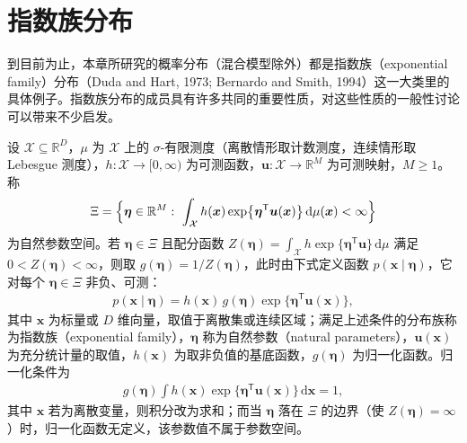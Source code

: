 \documentclass[../../main.tex]{subfiles}
\begin{document}
\section{指数族分布}\label{section:ch03-指数族分布}

到目前为止，本章所研究的概率分布（混合模型除外）都是指数族（exponential family）分布（Duda and Hart, 1973; Bernardo and Smith, 1994）这一大类里的具体例子。指数族分布的成员具有许多共同的重要性质，对这些性质的一般性讨论可以带来不少启发。

\begin{definition}[指数族分布]\label{definition:ch03-指数族分布}
设 $\mathcal{X}\subseteq\mathbb{R}^{D}$，$\mu$ 为 $\mathcal{X}$ 上的 $\sigma$-有限测度（离散情形取计数测度，连续情形取 Lebesgue 测度），$h:\mathcal{X}\to[0,\infty)$ 为可测函数，$\boldsymbol{u}:\mathcal{X}\to\mathbb{R}^{M}$ 为可测映射，$M\geqslant1$。称
\begin{align*}
\Xi=\Bigl\{\boldsymbol{\eta}\in\mathbb{R}^{M}:\ \int_{\mathcal{X}}h(\boldsymbol{x})\exp\bigl\{\boldsymbol{\eta}^{\mathsf{T}}\boldsymbol{u}(\boldsymbol{x})\bigr\}\,\mathrm{d}\mu(\boldsymbol{x})<\infty\Bigr\}
\end{align*}
为自然参数空间。若 $\boldsymbol{\eta}\in\Xi$ 且配分函数 $Z(\boldsymbol{\eta})=\int_{\mathcal{X}}h\exp\{\boldsymbol{\eta}^{\mathsf{T}}\boldsymbol{u}\}\,\mathrm{d}\mu$ 满足 $0<Z(\boldsymbol{\eta})<\infty$，则取 $g(\boldsymbol{\eta})=1/Z(\boldsymbol{\eta})$，此时由下式定义函数 $p(\boldsymbol{x}\mid\boldsymbol{\eta})$，它对每个 $\boldsymbol{\eta}\in\Xi$ 非负、可测：
\begin{align}
p(\boldsymbol{x}\mid\boldsymbol{\eta})=h(\boldsymbol{x})\,g(\boldsymbol{\eta})\exp\bigl\{\boldsymbol{\eta}^{\mathsf{T}}\boldsymbol{u}(\boldsymbol{x})\bigr\},
\label{align:ch03-指数族定义}
\end{align}
其中 $\boldsymbol{x}$ 为标量或 $D$ 维向量，取值于离散集或连续区域；满足上述条件的分布族称为指数族（exponential family），$\boldsymbol{\eta}$ 称为自然参数（natural parameters），$\boldsymbol{u}(\boldsymbol{x})$ 为充分统计量的取值，$h(\boldsymbol{x})$ 为取非负值的基底函数，$g(\boldsymbol{\eta})$ 为归一化函数。归一化条件为
\begin{align}
g(\boldsymbol{\eta})\int h(\boldsymbol{x})\exp\bigl\{\boldsymbol{\eta}^{\mathsf{T}}\boldsymbol{u}(\boldsymbol{x})\bigr\}\,\mathrm{d}\boldsymbol{x}=1,
\label{align:ch03-指数族归一}
\end{align}
其中 $\boldsymbol{x}$ 若为离散变量，则积分改为求和；而当 $\boldsymbol{\eta}$ 落在 $\Xi$ 的边界（使 $Z(\boldsymbol{\eta})=\infty$）时，归一化函数无定义，该参数值不属于参数空间。
\end{definition}
\end{document}

